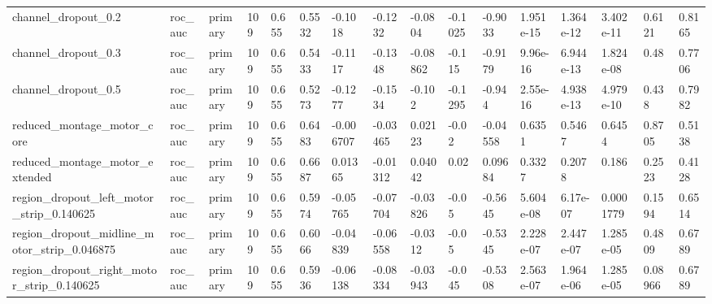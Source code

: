 \begin{tabular}{llllllllllllllll}
channel\_dropout\_0.2 & roc\_auc & primary & 109 & 0.655 & 0.5532 & -0.1018 & -0.1232 & -0.0804 & -0.1025 & -0.9033 & 1.951e-15 & 1.364e-12 & 3.402e-11 & 0.6121 & 0.8165 \\
channel\_dropout\_0.3 & roc\_auc & primary & 109 & 0.655 & 0.5433 & -0.1117 & -0.1348 & -0.08862 & -0.115 & -0.9179 & 9.96e-16 & 6.944e-13 & 1.824e-08 & 0.48 & 0.7706 \\
channel\_dropout\_0.5 & roc\_auc & primary & 109 & 0.655 & 0.5273 & -0.1277 & -0.1534 & -0.102 & -0.1295 & -0.944 & 2.55e-16 & 4.938e-13 & 4.979e-10 & 0.438 & 0.7982 \\
reduced\_montage\_motor\_core & roc\_auc & primary & 109 & 0.655 & 0.6483 & -0.006707 & -0.03465 & 0.02123 & -0.02 & -0.04558 & 0.6351 & 0.5467 & 0.6454 & 0.8705 & 0.5138 \\
reduced\_montage\_motor\_extended & roc\_auc & primary & 109 & 0.655 & 0.6687 & 0.01365 & -0.01312 & 0.04042 & 0.02 & 0.09684 & 0.3327 & 0.2078 & 0.186 & 0.2523 & 0.4128 \\
region\_dropout\_left\_motor\_strip\_0.140625 & roc\_auc & primary & 109 & 0.655 & 0.5974 & -0.05765 & -0.07704 & -0.03826 & -0.05 & -0.5645 & 5.604e-08 & 6.17e-07 & 0.0001779 & 0.1594 & 0.6514 \\
region\_dropout\_midline\_motor\_strip\_0.046875 & roc\_auc & primary & 109 & 0.655 & 0.6066 & -0.04839 & -0.06558 & -0.0312 & -0.05 & -0.5345 & 2.228e-07 & 2.447e-07 & 1.285e-05 & 0.4809 & 0.6789 \\
region\_dropout\_right\_motor\_strip\_0.140625 & roc\_auc & primary & 109 & 0.655 & 0.5936 & -0.06138 & -0.08334 & -0.03943 & -0.045 & -0.5308 & 2.563e-07 & 1.964e-06 & 1.285e-05 & 0.08966 & 0.6789 \\
\bottomrule
\end{tabular}
